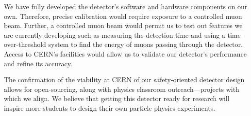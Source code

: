 We have fully developed the detector’s software and hardware components on our own. Therefore, precise calibration would require exposure to a controlled muon beam. Further, a controlled muon beam would permit us to test out features we are currently developing such as measuring the detection time and using a time-over-threshold system to find the energy of muons passing through the detector. Access to CERN’s facilities would allow us to validate our detector’s performance and refine its accuracy.

The confirmation of the viability at CERN of our safety-oriented detector design allows for open-sourcing, along with physics classroom outreach—projects with which we align. We believe that getting this detector ready for research will inspire more students to design their own particle physics experiments.

